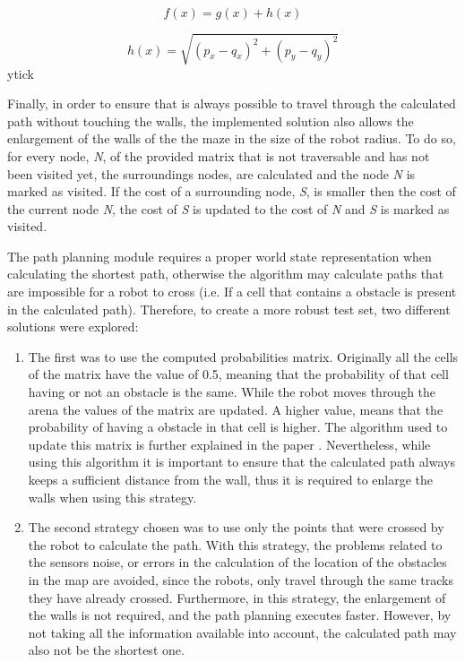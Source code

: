\documentclass[oribibl]{llncs}
\begin{document}
\begin{equation}
f(x) = g(x) + h(x)
\end{equation}

\begin{equation}
h(x) = \sqrt{(p_x - q_x)^2 + (p_y - q_y)^2}
\end{equation}ytick 

Finally, in order to ensure that is always possible to travel through the calculated path without touching the walls, the implemented solution also allows the enlargement of the walls of the the maze in the size of the robot radius. To do so, for every node, \textit{N}, of the provided matrix that is not traversable and has not been visited yet, the surroundings nodes, are calculated and the node \textit{N} is marked as visited. If the cost of a surrounding node, \textit{S}, is smaller then the cost of the current node \textit{N}, the cost of \textit{S} is updated to the cost of \textit{N} and \textit{S} is marked as visited.

The path planning module requires a proper world state representation when calculating the shortest path, otherwise the algorithm may calculate paths that are impossible for a robot to cross (i.e. If a cell that contains a obstacle is present in the calculated path). Therefore, to create a more robust test set, two different solutions were explored:
\begin{enumerate}
\item The first was to use the computed probabilities matrix. Originally all the cells of the matrix have the value of 0.5, meaning that the probability of that cell having or not an obstacle is the same. While the robot moves through the arena the values of the matrix are updated. A higher value, means that the probability of having a obstacle in that cell is higher. The algorithm used to update this matrix is further explained in the paper \cite{baboehelder}. Nevertheless, while using this algorithm it is important to ensure that the calculated path always keeps a sufficient distance from the wall, thus it is required to enlarge the walls when using this strategy.

\item The second strategy chosen was to use only the points that were crossed by the robot to calculate the path. With this strategy, the problems related to the sensors noise, or errors in the calculation of the location of the obstacles in the map are avoided, since the robots, only travel through the same tracks they have already crossed. Furthermore, in this strategy, the enlargement of the walls is not required, and the path planning executes faster. However, by not taking all the information available into account, the calculated path may also not be the shortest one.
\end{enumerate}
\end{document}
